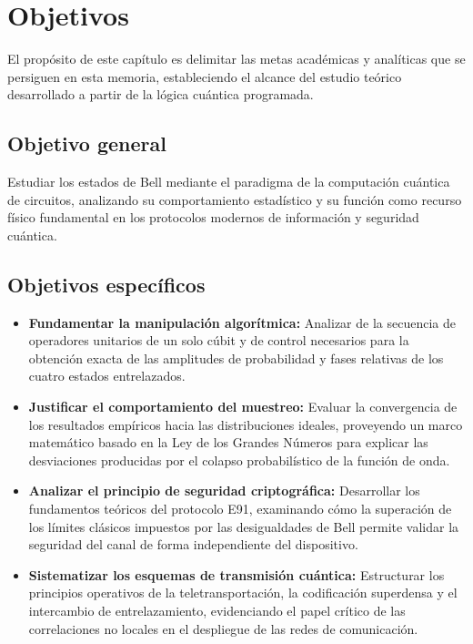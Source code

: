 \documentclass[11pt,a4paper,spanish]{book}
\begin{document}
\chapter{Objetivos}

El propósito de este capítulo es delimitar las metas académicas y analíticas que se persiguen en esta memoria, estableciendo el alcance del estudio teórico desarrollado a partir de la lógica cuántica programada.

\section{Objetivo general}
Estudiar los estados de Bell mediante el paradigma de la computación cuántica de circuitos, analizando su comportamiento estadístico y su función como recurso físico fundamental en los protocolos modernos de información y seguridad cuántica.

\section{Objetivos específicos}
\begin{itemize}
    \item \textbf{Fundamentar la manipulación algorítmica:} Analizar de la secuencia de operadores unitarios de un solo cúbit y de control necesarios para la obtención exacta de las amplitudes de probabilidad y fases relativas de los cuatro estados entrelazados.
    
    \item \textbf{Justificar el comportamiento del muestreo:} Evaluar la convergencia de los resultados empíricos hacia las distribuciones ideales, proveyendo un marco matemático basado en la Ley de los Grandes Números para explicar las desviaciones producidas por el colapso probabilístico de la función de onda.
    
    \item \textbf{Analizar el principio de seguridad criptográfica:} Desarrollar los fundamentos teóricos del protocolo E91, examinando cómo la superación de los límites clásicos impuestos por las desigualdades de Bell permite validar la seguridad del canal de forma independiente del dispositivo.
    
    \item \textbf{Sistematizar los esquemas de transmisión cuántica:} Estructurar los principios operativos de la teletransportación, la codificación superdensa y el intercambio de entrelazamiento, evidenciando el papel crítico de las correlaciones no locales en el despliegue de las redes de comunicación.
\end{itemize}
\end{document}
